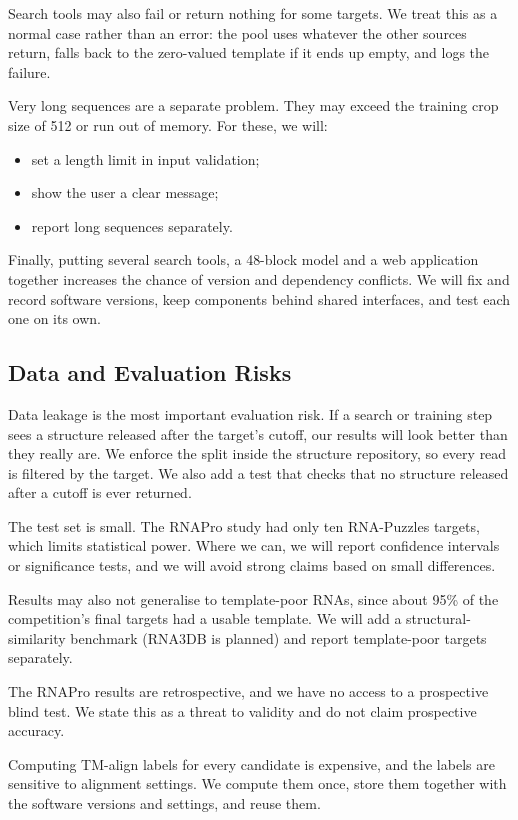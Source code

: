 \documentclass{FastFyp}
\begin{document}
Search tools may also fail or return nothing for some targets. We treat this as a normal case rather than an error: the pool uses whatever the other sources return, falls back to the zero-valued template if it ends up empty, and logs the failure.

Very long sequences are a separate problem. They may exceed the training crop size of 512 or run out of memory. For these, we will:
\begin{itemize}
\item set a length limit in input validation;
\item show the user a clear message;
\item report long sequences separately.
\end{itemize}

Finally, putting several search tools, a 48-block model and a web application together increases the chance of version and dependency conflicts. We will fix and record software versions, keep components behind shared interfaces, and test each one on its own.

\subsection{Data and Evaluation Risks}
Data leakage is the most important evaluation risk. If a search or training step sees a structure released after the target's cutoff, our results will look better than they really are. We enforce the split inside the structure repository, so every read is filtered by the target. We also add a test that checks that no structure released after a cutoff is ever returned.

The test set is small. The RNAPro study had only ten RNA-Puzzles targets, which limits statistical power. Where we can, we will report confidence intervals or significance tests, and we will avoid strong claims based on small differences.

Results may also not generalise to template-poor RNAs, since about 95\% of the competition's final targets had a usable template. We will add a structural-similarity benchmark (RNA3DB is planned) and report template-poor targets separately.

The RNAPro results are retrospective, and we have no access to a prospective blind test. We state this as a threat to validity and do not claim prospective accuracy.

Computing TM-align labels for every candidate is expensive, and the labels are sensitive to alignment settings. We compute them once, store them together with the software versions and settings, and reuse them.
\end{document}
